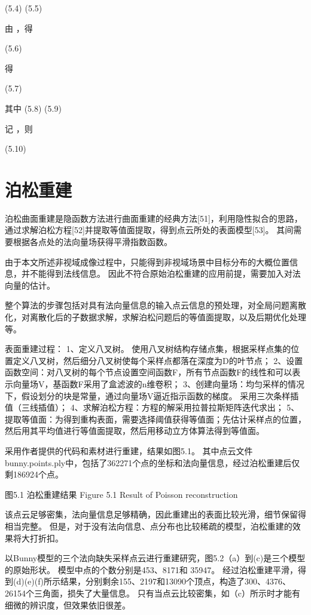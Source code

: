 	  	(5.4)
	  	(5.5)

由 ，得

	  	(5.6)
  
得

	  	(5.7)

其中
	  	(5.8)
	  	(5.9)

记 ，则

	  	(5.10)

\section{泊松重建}
泊松曲面重建是隐函数方法进行曲面重建的经典方法[51]，利用隐性拟合的思路，通过求解泊松方程[52]并提取等值面提取，得到点云所处的表面模型[53]。
其间需要根据各点处的法向量场获得平滑指数函数。

由于本文所述非视域成像过程中，只能得到非视域场景中目标分布的大概位置信息，并不能得到法线信息。
因此不符合原始泊松重建的应用前提，需要加入对法向量的估计。

整个算法的步骤包括对具有法向量信息的输入点云信息的预处理，对全局问题离散化，对离散化后的子数据求解，求解泊松问题后的等值面提取，以及后期优化处理等。

表面重建过程：
1、定义八叉树。
使用八叉树结构存储点集，根据采样点集的位置定义八叉树，然后细分八叉树使每个采样点都落在深度为D的叶节点；
2、设置函数空间：对八叉树的每个节点设置空间函数F，所有节点函数F的线性和可以表示向量场V，基函数F采用了盒滤波的n维卷积；
3、创建向量场：均匀采样的情况下，假设划分的块是常量，通过向量场V逼近指示函数的梯度。
采用三次条样插值（三线插值）；
4、求解泊松方程：方程的解采用拉普拉斯矩阵迭代求出；
5、提取等值面：为得到重构表面，需要选择阈值获得等值面；先估计采样点的位置，然后用其平均值进行等值面提取，然后用移动立方体算法得到等值面。

采用作者提供的代码和素材进行重建，结果如图5.1。
其中点云文件bunny.points.ply中，包括了362271个点的坐标和法向量信息，经过泊松重建后仅剩186924个点。

 
图5.1  泊松重建结果
Figure 5.1 Result of Poisson reconstruction 

该点云足够密集，法向量信息足够精确，因此重建出的表面比较光滑，细节保留得相当完整。
但是，对于没有法向信息、点分布也比较稀疏的模型，泊松重建的效果将大打折扣。

以Bunny模型的三个法向缺失采样点云进行重建研究，图5.2（a）到(c)是三个模型的原始形状。
模型中点的个数分别是453、8171和 35947。
经过泊松重建平滑，得到(d)(e)(f)所示结果，分别剩余155、2197和13090个顶点，构造了300、4376、26154个三角面，损失了大量信息。
只有当点云比较密集，如（c）所示时才能有细微的辨识度，但效果依旧很差。
 

